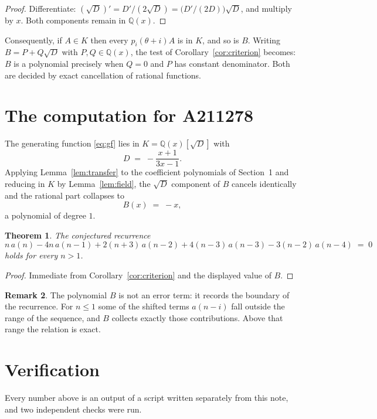 \documentclass[11pt,a4paper]{article}
\theoremstyle{plain}
\newtheorem{theorem}{Theorem}
\theoremstyle{definition}
\newtheorem{remark}[theorem]{Remark}
\begin{document}
\begin{proof}
Differentiate: $(\sqrt{D})'=D'/(2\sqrt{D})=\bigl(D'/(2D)\bigr)\sqrt{D}$, and multiply by
$x$. Both components remain in $\mathbb{Q}(x)$.
\end{proof}

Consequently, if $A\in K$ then every $p_{i}(\theta+i)A$ is in $K$, and so is $B$. Writing
$B=P+Q\sqrt{D}$ with $P,Q\in\mathbb{Q}(x)$, the test of Corollary~\ref{cor:criterion}
becomes: $B$ is a polynomial precisely when $Q=0$ and $P$ has constant denominator. Both
are decided by exact cancellation of rational functions.

\section{The computation for A211278}

The generating function \eqref{eq:gf} lies in $K=\mathbb{Q}(x)[\sqrt{D}]$ with
\[
D \;=\; - \frac{x + 1}{3 x - 1} .
\]
Applying Lemma~\ref{lem:transfer} to the coefficient polynomials of Section~1 and reducing
in $K$ by Lemma~\ref{lem:field}, the $\sqrt{D}$ component of $B$ cancels identically and
the rational part collapses to
\[
B(x)\;=\;- x ,
\]
a polynomial of degree $1$.

\begin{theorem}
The conjectured recurrence
\[
n\,a(n) -  4 n\,a(n-1) + 2 \left(n + 3\right)\,a(n-2) + 4 \left(n - 3\right)\,a(n-3) -  3 \left(n - 2\right)\,a(n-4) \;=\;0
\]
holds for every $n>1$.
\end{theorem}

\begin{proof}
Immediate from Corollary~\ref{cor:criterion} and the displayed value of $B$.
\end{proof}

\begin{remark}
The polynomial $B$ is not an error term: it records the boundary of the recurrence. For
$n\le1$ some of the shifted terms $a(n-i)$ fall outside the range of the sequence,
and $B$ collects exactly those contributions. Above that range the relation is exact.
\end{remark}

\section{Verification}

Every number above is an output of a script written separately from this note, and two
independent checks were run.
\end{document}
